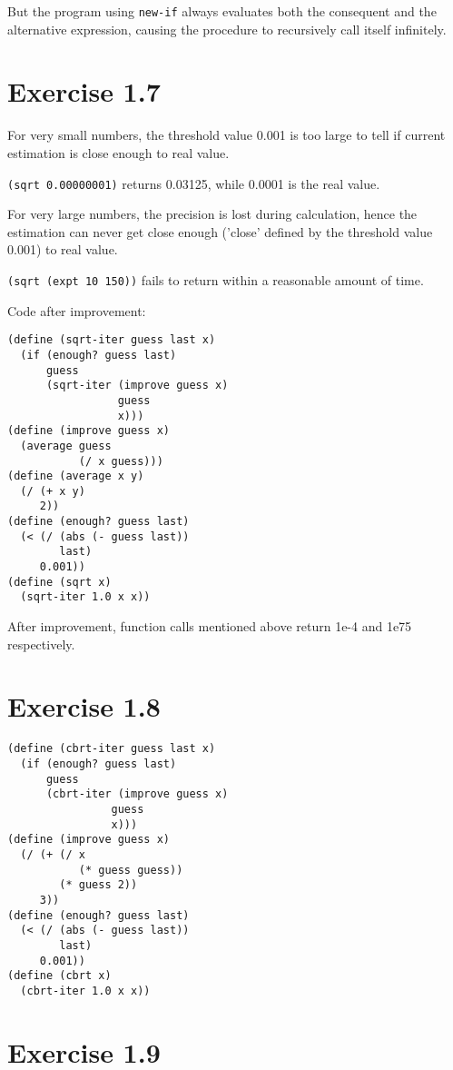 \documentclass[../main.tex]{subfiles}
\begin{document}
But the program using \lstinline{new-if} always evaluates both the consequent and the alternative expression, causing the procedure to recursively call itself infinitely.

\section{Exercise 1.7}

For very small numbers, the threshold value 0.001 is too large to tell if current estimation is close enough to real value.

\lstinline{(sqrt 0.00000001)} returns 0.03125, while 0.0001 is the real value.

For very large numbers, the precision is lost during calculation, hence the estimation can never get close enough ('close' defined by the threshold value 0.001) to real value.

\lstinline{(sqrt (expt 10 150))} fails to return within a reasonable amount of time.

Code after improvement:

\begin{lstlisting}
(define (sqrt-iter guess last x)
  (if (enough? guess last)
      guess
      (sqrt-iter (improve guess x)
                 guess
                 x)))
(define (improve guess x)
  (average guess
           (/ x guess)))
(define (average x y)
  (/ (+ x y)
     2))
(define (enough? guess last)
  (< (/ (abs (- guess last))
        last)
     0.001))
(define (sqrt x)
  (sqrt-iter 1.0 x x))
\end{lstlisting}

After improvement, function calls mentioned above return 1e-4 and 1e75 respectively.

\section{Exercise 1.8}

\begin{lstlisting}
(define (cbrt-iter guess last x)
  (if (enough? guess last)
      guess
      (cbrt-iter (improve guess x)
                guess
                x)))
(define (improve guess x)
  (/ (+ (/ x
           (* guess guess))
        (* guess 2))
     3))
(define (enough? guess last)
  (< (/ (abs (- guess last))
        last)
     0.001))
(define (cbrt x)
  (cbrt-iter 1.0 x x))
\end{lstlisting}

\section{Exercise 1.9}
\end{document}

